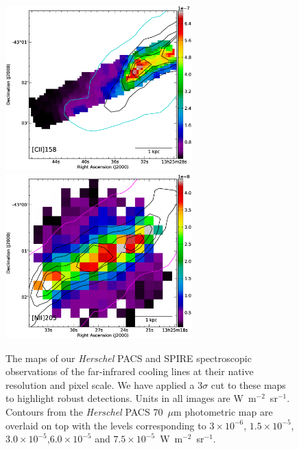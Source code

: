 \documentclass[preprint2]{aastex}
\begin{document}
\begin{figure}
 \includegraphics[width=7.2cm]{CenA_CII157_unconvolved_image_v1_cropped}
 \includegraphics[width=7.2cm]{CenA_NII205_unconvolved_image_v1}
\caption{The maps of our \emph{Herschel} PACS and SPIRE spectroscopic observations of the far-infrared cooling lines at their native resolution and pixel scale.  We have applied a 3$\sigma$ cut to these maps to highlight robust detections.  Units in all images are W~m$^{-2}$~sr$^{-1}$.  Contours from the \emph{Herschel} PACS 70~$\mu$m photometric map are overlaid on top with the levels corresponding to $3 \times 10^{-6}$,  $1.5 \times 10^{-5}$,$3.0 \times 10^{-5}$,$6.0 \times 10^{-5}$ and $7.5 \times 10^{-5}$~W~m$^{-2}$~sr$^{-1}$.}
\label{fig:pacs_spec_maps}
\end{figure}
\end{document}
